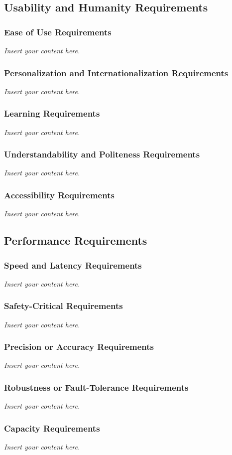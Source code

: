 \documentclass[12pt]{article}
\newcommand{\lips}{\textit{Insert your content here.}}
\begin{document}
\subsection{Usability and Humanity Requirements}
\subsubsection{Ease of Use Requirements}
\lips
\subsubsection{Personalization and Internationalization Requirements}
\lips
\subsubsection{Learning Requirements}
\lips
\subsubsection{Understandability and Politeness Requirements}
\lips
\subsubsection{Accessibility Requirements}
\lips

\subsection{Performance Requirements}
\subsubsection{Speed and Latency Requirements}
\lips
\subsubsection{Safety-Critical Requirements}
\lips
\subsubsection{Precision or Accuracy Requirements}
\lips
\subsubsection{Robustness or Fault-Tolerance Requirements}
\lips
\subsubsection{Capacity Requirements}
\lips
\end{document}
